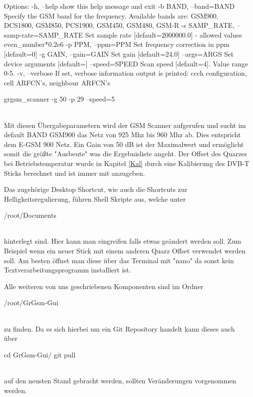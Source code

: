 \begin{code}
Options:
  -h, --help            show this help message and exit
  -b BAND, --band=BAND  Specify the GSM band for the frequency. Available
                        bands are: GSM900, DCS1800, GSM850, PCS1900, GSM450,
                        GSM480, GSM-R
  -s SAMP_RATE, --samp-rate=SAMP_RATE
                        Set sample rate [default=2000000.0] - allowed values
                        even_number*0.2e6
  -p PPM, --ppm=PPM     Set frequency correction in ppm [default=0]
  -g GAIN, --gain=GAIN  Set gain [default=24.0]
  --args=ARGS           Set device arguments [default=]
  --speed=SPEED         Scan speed [default=4]. Value range 0-5.
  -v, --verbose         If set, verbose information output is printed: ccch
                        configuration, cell ARFCN's, neighbour ARFCN's
                        
                   
grgsm_scanner -g 50 -p 29 --speed=5
\end{code}
\noindent\\Mit diesen Übergabeparametern wird der \ac{GSM} Scanner aufgerufen und sucht im default BAND GSM900 das Netz von 925 Mhz bis 960 Mhz ab. Dies entspricht dem E-GSM 900 Netz. Ein Gain von 50 dB ist der Maximalwert und ermöglicht somit die größte "Ausbeute" was die Ergebnisliste angeht. Der Offset des Quarzes bei Betriebstemperatur wurde in Kapitel \ref{Kal} durch eine Kalibierung des DVB-T Sticks berechnet und ist immer mit anzugeben. 

Das zugehörige Desktop Shortcut, wie auch die Shortcuts zur Helligkeitsregulierung, führen Shell Skripte aus, welche unter 
\begin{code}
/root/Documents
\end{code}
\noindent\\hinterlegt sind. Hier kann man eingreifen falls etwas geändert werden soll. Zum Beispiel wenn ein neuer Stick mit einem anderen Quarz Offset verwendet werden soll. Am besten öffnet man diese über das Terminal mit "nano" da sonst kein Textverarbeitungsprogramm installiert ist. 

Alle weiteren von uns geschriebenen Komponenten sind im Ordner 
\begin{code}
/root/GrGsm-Gui
\end{code}
\noindent\\zu finden. Da es sich hierbei um ein Git Repository handelt kann dieses auch über 
\begin{code}
cd GrGsm-Gui/
git pull
\end{code}
\noindent\\auf den neusten Stand gebracht werden, sollten Veränderungen vorgenommen werden. 

